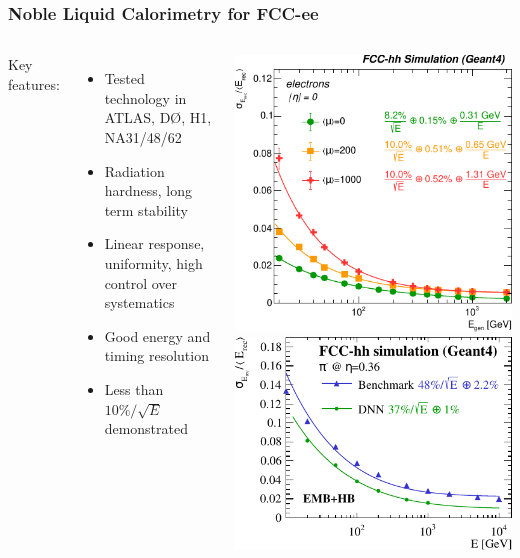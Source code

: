 \documentclass[aspectratio=169]{beamer}
\newcommand{\bluetext}[1]{%
  \textcolor{myBlue}{#1}
}
\begin{document}
\begin{frame}
  \frametitle{Noble Liquid Calorimetry for FCC-ee}

  \begin{columns}[c]
    \bluetext{Key features:}
    \begin{itemize}
      \item Tested technology in ATLAS, D\O, H1, NA31/48/62
      \item Radiation hardness, long term stability
      \item Linear response, uniformity, high control over systematics
      \item Good energy and timing resolution
      \item Less than $10\%/\sqrt{E}$ demonstrated
    \end{itemize}

    \begin{center}
      \includegraphics[width=.6\linewidth]{figures/FCC_hh_LAr_electron_performance_mu.pdf}
      \includegraphics[width=.6\linewidth]{figures/FCC_hh_LAr_pion_performance.pdf}
    \end{center}
  \end{columns}
\end{frame}
\end{document}
